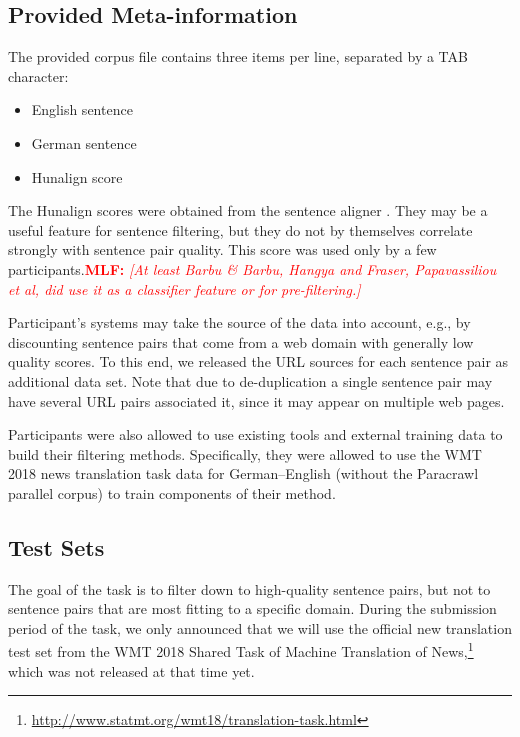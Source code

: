 \documentclass[11pt,a4paper]{article}
\newcommand{\todomlf}[1] {\textcolor{red}{\textbf{MLF:} \em [#1]}\marginpar{\textcolor{red}{\Large \textbf{!!!}}}}
\begin{document}
\subsection{Provided Meta-information}
\label{ss:meta}
The provided corpus file contains three items per line, separated by a TAB character:
\begin{itemize}\itemsep -1mm \vspace{-2mm}
\item English sentence
\item German sentence
\item Hunalign score
\end{itemize}

The Hunalign scores were obtained from the sentence aligner \citep{hunalign}. They may be a useful feature for sentence filtering, but they do not by themselves correlate strongly with sentence pair quality. %
This score was used only by a few participants.\todomlf{At least Barbu \& Barbu, Hangya and Fraser, Papavassiliou et al, did use it as a classifier feature or for pre-filtering.}

Participant's systems may take the source of the data into account, e.g., by discounting sentence pairs that come from a web domain with generally low quality scores. To this end, we released the URL sources for each sentence pair as additional data set. Note that due to de-duplication a single sentence pair may have several URL pairs associated it, since it may appear on multiple web pages.

Participants were also allowed to use existing tools and external training data to build their filtering methods. Specifically, they were 
allowed 
to use the WMT 2018 news translation task data for German--English (without the Paracrawl parallel corpus) to train components of their method.

\subsection{Test Sets}
The goal of the task is to filter down to high-quality sentence pairs, but not to sentence pairs that are most fitting to a specific domain. During the submission period of the task, we only announced that we will use the official new translation test set from the WMT 2018 Shared Task of Machine Translation of News,\footnote{\url{http://www.statmt.org/wmt18/translation-task.html}} which was not released at that time yet.
\end{document}
